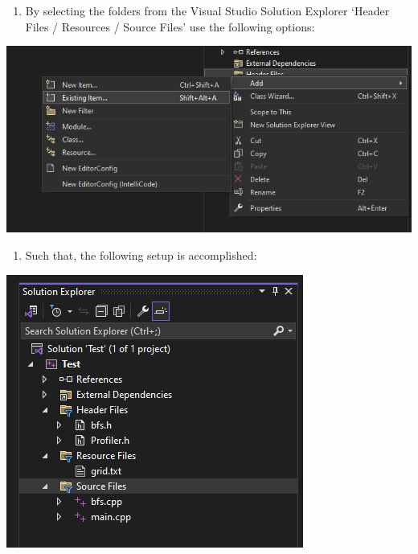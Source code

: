 \documentclass[../en-fa-lab.tex]{subfiles}
\begin{document}
\begin{enumerate}
\def\labelenumi{\arabic{enumi}.}
\setcounter{enumi}{4}
\item
  By selecting the folders from the Visual Studio Solution Explorer
  `Header Files / Resources / Source Files' use the following options:
\end{enumerate}

\includegraphics[width=\textwidth,alt={A screenshot of a computer Description automatically generated}]{./Resources/tutorial_lab9/image6.png}

\begin{enumerate}
\def\labelenumi{\arabic{enumi}.}
\setcounter{enumi}{5}
\item
  Such that, the following setup is accomplished:
\end{enumerate}

\includegraphics[width=\textwidth,alt={A screenshot of a computer Description automatically generated}]{./Resources/tutorial_lab9/image7.png}
\end{document}
